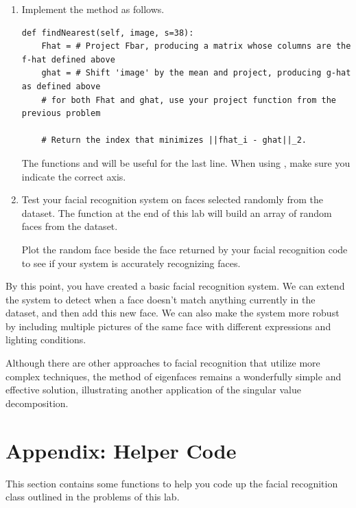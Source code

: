 \begin{problem}
\label{prob:nearest}
\leavevmode
\begin{enumerate}
\item
Implement the method  as follows.
\begin{lstlisting}
def findNearest(self, image, s=38):
    Fhat = # Project Fbar, producing a matrix whose columns are the f-hat defined above 
    ghat = # Shift 'image' by the mean and project, producing g-hat as defined above
    # for both Fhat and ghat, use your project function from the previous problem
    
    # Return the index that minimizes ||fhat_i - ghat||_2.
\end{lstlisting}
The functions  and  will be useful for the last line. When using , make sure you indicate the correct axis. 

\item Test your facial recognition system on faces selected randomly from the  dataset.
The function  at the end of this lab will build an array of  random faces from the  dataset.

Plot the random face beside the face returned by your facial recognition code to see if your system is accurately recognizing faces.

\end{enumerate}
\end{problem}


By this point, you have created a basic facial recognition system.
We can extend the system to detect when a face doesn't match anything currently in the dataset, and then add this new face.
We can also make the system more robust by including multiple pictures of the same face with different expressions and lighting conditions.

Although there are other approaches to facial recognition that utilize more complex techniques, the method of eigenfaces remains
a wonderfully simple and effective solution, illustrating another application of the singular value decomposition.

\section*{Appendix: Helper Code}
This section contains some functions to help you code up the facial recognition class outlined in the problems of this lab.

